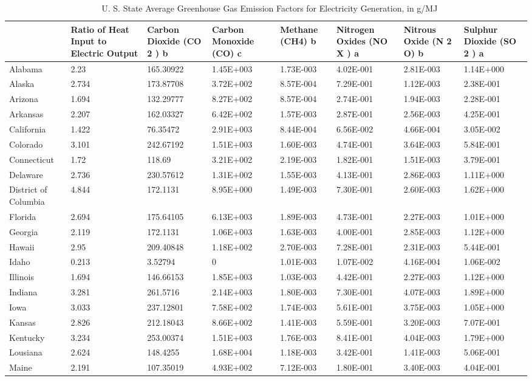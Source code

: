 \begin{longtable}[c]{p{0.75in}p{0.75in}p{0.75in}p{0.75in}p{0.75in}p{0.75in}p{0.75in}p{0.75in}}
\caption{  U. S. State Average Greenhouse Gas Emission Factors for Electricity Generation, in g/MJ \protect \label{table:u.-s.-state-average-greenhouse-gas-emission}}\\
\toprule 
 & Ratio of Heat Input to Electric Output & Carbon Dioxide (CO 2 ) b & Carbon Monoxide (CO) c & Methane (CH4) b & Nitrogen Oxides (NO X ) a & Nitrous Oxide (N 2 O) b & Sulphur Dioxide (SO 2 ) a \tabularnewline \midrule
\endhead
Alabama & 2.23 & 165.30922 & 1.45E+003 & 1.73E-003 & 4.02E-001 & 2.81E-003 & 1.14E+000 \tabularnewline
Alaska & 2.734 & 173.87708 & 3.72E+002 & 8.57E-004 & 7.29E-001 & 1.12E-003 & 2.38E-001 \tabularnewline
Arizona & 1.694 & 132.29777 & 8.27E+002 & 8.57E-004 & 2.74E-001 & 1.94E-003 & 2.28E-001 \tabularnewline
Arkansas & 2.207 & 162.03327 & 6.42E+002 & 1.57E-003 & 2.87E-001 & 2.56E-003 & 4.25E-001 \tabularnewline
California & 1.422 & 76.35472 & 2.91E+003 & 8.44E-004 & 6.56E-002 & 4.66E-004 & 3.05E-002 \tabularnewline
Colorado & 3.101 & 242.67192 & 1.51E+003 & 1.60E-003 & 4.74E-001 & 3.64E-003 & 5.84E-001 \tabularnewline
Connecticut & 1.72 & 118.69 & 3.21E+002 & 2.19E-003 & 1.82E-001 & 1.51E-003 & 3.79E-001 \tabularnewline
Delaware & 2.736 & 230.57612 & 1.31E+002 & 1.55E-003 & 4.13E-001 & 2.86E-003 & 1.11E+000 \tabularnewline
District of Columbia & 4.844 & 172.1131 & 8.95E+000 & 1.49E-003 & 7.30E-001 & 2.60E-003 & 1.62E+000 \tabularnewline
Florida & 2.694 & 175.64105 & 6.13E+003 & 1.89E-003 & 4.73E-001 & 2.27E-003 & 1.01E+000 \tabularnewline
Georgia & 2.119 & 172.1131 & 1.06E+003 & 1.63E-003 & 4.00E-001 & 2.85E-003 & 1.12E+000 \tabularnewline
Hawaii & 2.95 & 209.40848 & 1.18E+002 & 2.70E-003 & 7.28E-001 & 2.31E-003 & 5.44E-001 \tabularnewline
Idaho & 0.213 & 3.52794 & 0 & 1.01E-003 & 1.07E-002 & 4.16E-004 & 1.06E-002 \tabularnewline
Illinois & 1.694 & 146.66153 & 1.85E+003 & 1.03E-003 & 4.42E-001 & 2.27E-003 & 1.12E+000 \tabularnewline
Indiana & 3.281 & 261.5716 & 2.14E+003 & 1.80E-003 & 7.30E-001 & 4.07E-003 & 1.89E+000 \tabularnewline
Iowa & 3.033 & 237.12801 & 7.58E+002 & 1.74E-003 & 5.61E-001 & 3.75E-003 & 1.05E+000 \tabularnewline
Kansas & 2.826 & 212.18043 & 8.66E+002 & 1.41E-003 & 5.59E-001 & 3.20E-003 & 7.07E-001 \tabularnewline
Kentucky & 3.234 & 253.00374 & 1.51E+003 & 1.76E-003 & 8.41E-001 & 4.04E-003 & 1.79E+000 \tabularnewline
Lousiana & 2.624 & 148.4255 & 1.68E+004 & 1.18E-003 & 3.42E-001 & 1.41E-003 & 5.06E-001 \tabularnewline
Maine & 2.191 & 107.35019 & 4.93E+002 & 7.12E-003 & 1.80E-001 & 3.40E-003 & 4.04E-001 \tabularnewline

\end{longtable}
